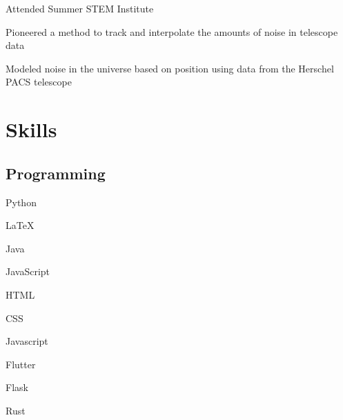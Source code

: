 \documentclass[]{deedy-resume-openfont}
\begin{document}
\begin{minipage}[t]{0.66\textwidth}
\begin{tightemize}
\item Attended Summer STEM Institute
\item Pioneered a method to track and interpolate the amounts of noise in telescope data
\item Modeled noise in the universe based on position using data from the Herschel PACS telescope
\end{tightemize}
\sectionsep


%
%


\end{minipage}%
\hfill
\begin{minipage}[t]{0.33\textwidth} 


\section{Skills}
\subsection{Programming}
\vspace{\topsep}
\begin{tightemize}
\item Python 
\item \LaTeX
\end{tightemize}


\begin{tightemize}
\item Java
\item JavaScript
\end{tightemize}



\begin{tightemize}
\item HTML 
\item CSS 
\item Javascript
\item Flutter 
\item Flask 
\item Rust
\end{tightemize}



\end{minipage}
\end{document}
